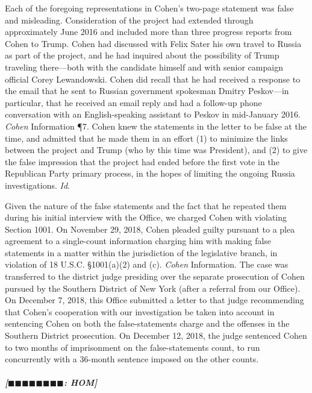 Each of the foregoing representations in Cohen's two-page statement was false and misleading.
Consideration of the project had extended through approximately June 2016 and included more than three progress reports from Cohen to Trump.
Cohen had discussed with Felix Sater his own travel to Russia as part of the project, and he had inquired about the possibility of Trump traveling there---both with the candidate himself and with senior campaign official Corey Lewandowski.
Cohen did recall that he had received a response to the email that he sent to Russian government spokesman Dmitry Peskov---in particular, that he received an email reply and had a follow-up phone conversation with an English-speaking assistant to Peskov in mid-January 2016.
\textit{Cohen} Information \P 7.
Cohen knew the statements in the letter to be false at the time, and admitted that he made them in an effort (1) to minimize the links between the project and Trump (who by this time was President), and (2) to give the false impression that the project had ended before the first vote in the Republican Party primary process, in the hopes of limiting the ongoing Russia investigations.
\textit{Id}.

Given the nature of the false statements and the fact that he repeated them during his initial interview with the Office, we charged Cohen with violating Section 1001.
On November 29, 2018, Cohen pleaded guilty pursuant to a plea agreement to a single-count information charging him with making false statements in a matter within the jurisdiction of the legislative branch, in violation of 18 U.S.C. \S 1001(a)(2) and (c).
\textit{Cohen} Information.
The case was transferred to the district judge presiding over the separate prosecution of Cohen pursued by the Southern District of New York (after a referral from our Office).
On December 7, 2018, this Office submitted a letter to that judge recommending that Cohen's cooperation with our investigation be taken into account in sentencing Cohen on both the false-statements charge and the offenses in the Southern District prosecution.
On December 12, 2018, the judge sentenced Cohen to two months of imprisonment on the false-statements count, to run concurrently with a 36-month sentence imposed on the other counts.

\subparagraph{[$\blacksquare\blacksquare\blacksquare\blacksquare\blacksquare\blacksquare\blacksquare\blacksquare$: HOM]}


